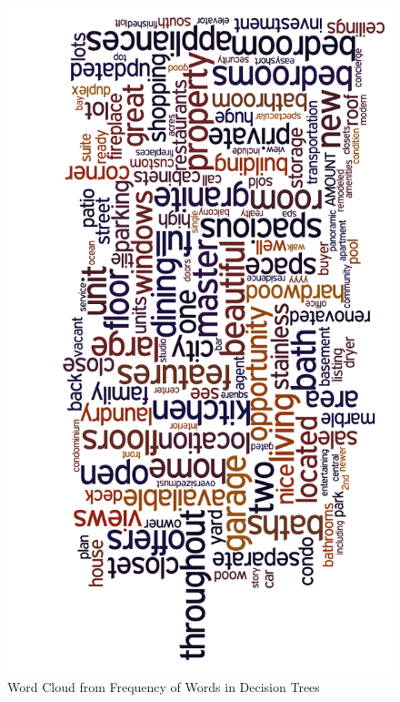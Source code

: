 \documentclass[11pt]{article}
\begin{document}
\begin{figure}
	\centering
	\includegraphics[scale=0.55]{word_cloud.png}
	\caption{Word Cloud from Frequency of Words in Decision Trees}
	\label{WordCloud}
\end{figure}
\end{document}
